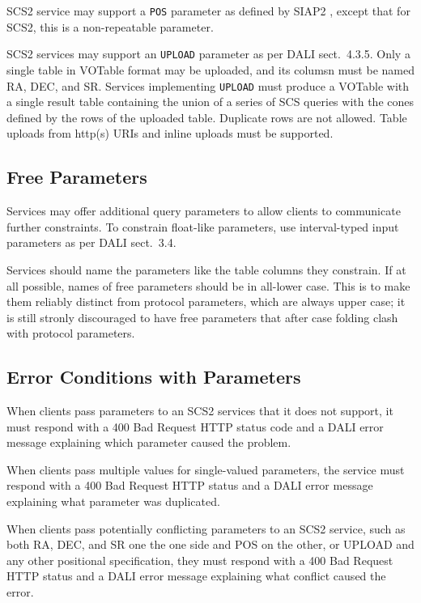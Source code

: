 \documentclass[11pt,a4paper]{ivoa}
\begin{document}
SCS2 service may support a \verb|POS| parameter as defined by SIAP2
\citep{2015ivoa.spec.1223D}, except that for SCS2, this is a
non-repeatable parameter.

SCS2 services may support an \texttt{UPLOAD} parameter as per DALI
sect.~4.3.5.  Only a single table in VOTable format may be uploaded, and
its columsn must be named RA, DEC, and SR.  Services implementing
\verb|UPLOAD|
must produce a VOTable with a single result table containing the union
of a series of SCS queries with the cones defined by the rows of the
uploaded table.  Duplicate rows are not allowed.  Table uploads from
http(s) URIs and inline uploads must be supported.

\subsection{Free Parameters}

Services may offer additional query parameters to allow clients to
communicate further constraints.  To constrain float-like parameters,
use interval-typed input parameters as per DALI sect.~3.4.

Services should name the parameters like the table columns they
constrain.  If at all possible, names of free parameters should be in
all-lower case.  This is to make them reliably distinct from protocol
parameters, which are always upper case; it is still stronly discouraged
to have free parameters that after case folding clash with protocol
parameters.

\subsection{Error Conditions with Parameters}

When clients pass parameters to an SCS2 services that it does not support,
it must respond with a 400 Bad Request HTTP status code and a DALI error
message explaining which parameter caused the problem.

When clients pass multiple values for single-valued parameters, the
service must respond with a 400 Bad Request HTTP status and a DALI error
message explaining what parameter was duplicated.

When clients pass potentially conflicting parameters to an SCS2 service,
such as both RA, DEC, and SR one the one side and POS on the other, or
UPLOAD and any other positional specification, they must respond with a
400 Bad Request HTTP status and a DALI error message explaining what
conflict caused the error.
\end{document}
